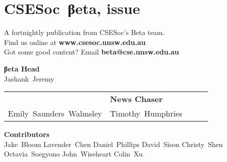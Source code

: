 \documentclass[twoside]{article}
\date{12 August 2015}
\makeatletter
\gdef\the@issue{109}
\makeatother
\begin{document}

\newpage
\maketitle\thispagestyle{mag}
\vspace*{-2em}\section*{CSE{}Soc~βeta, issue \makeatletter\the@issue}
\begin{multicols}{2}\begingroup\raggedcolumns
\begin{center}
A fortnightly publication from CSESoc's Beta team.\\
Find us online at \textbf{www.csesoc.unsw.edu.au}\\
Got some good content? Email \textbf{beta@cse.unsw.edu.au}\\
\par{\bf\sffamily βeta Head}\\ Jashank~Jeremy
\par\begin{tabular}{>{\raggedleft}p{0.5\linewidth}>{\raggedright}p{0.5\linewidth}}
{\bf\sffamily Puzzle Wrangler} & {\bf\sffamily News Chaser}\tabularnewline
Emily~Saunders~Walmsley & Timothy~Humphries\tabularnewline
\end{tabular}
\par{\bf\sffamily Contributors}\\
  Jake~Bloom\hsp{}
  Lavender~Chen\hsp{}
  Daniel~Phillips\hsp{}
  David~Sison\hsp{}
  Christy~Shen\hsp{}
  Octavia~Soegyono\hsp{}
  John~Wiseheart\hsp{}
  Colin~Xu\hsp{}
\end{center}
\columnbreak\malcontents\vfill\endgroup
\end{multicols}\LRmulticolcolumns
\vspace*{-4em}\begin{multicols}{2}


\end{multicols}
\end{document}
